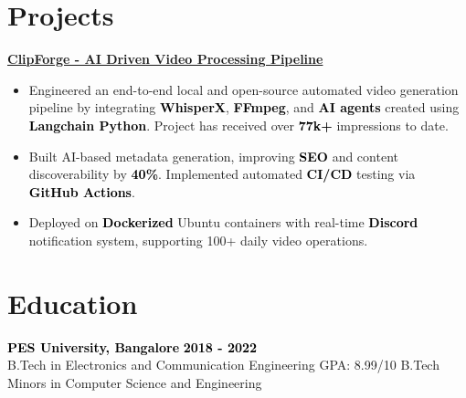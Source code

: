 \documentclass[a4paper,10pt]{article}
\newcommand{\bb}[1]{\textcolor{black}{\textbf{#1}}}
\begin{document}
\section{Projects}
\bb{\href{https://github.com/rajathjn/shorts_maker}{ClipForge - AI Driven Video Processing Pipeline}}
\smallskip
\begin{itemize}[nosep, leftmargin=2em, itemsep=3pt]
    \item Engineered an end-to-end local and open-source automated video generation pipeline by integrating \bb{WhisperX}, \bb{FFmpeg}, and \bb{AI agents} created using \bb{Langchain Python}. Project has received over \bb{77k+} impressions to date.
    \item Built AI-based metadata generation, improving \bb{SEO} and content discoverability by \bb{40\%}. Implemented automated \bb{CI/CD} testing via \bb{GitHub Actions}.
    \item Deployed on \bb{Dockerized} Ubuntu containers with real-time \bb{Discord} notification system, supporting 100+ daily video operations.
\end{itemize}
\vspace{-1em}
%
%
\section{Education}
\bb{PES University, Bangalore} \hfill \bb{2018 - 2022} \\
B.Tech in Electronics and Communication Engineering \hfill GPA: 8.99/10
\newline
B.Tech Minors in Computer Science and Engineering
%
%
\end{document}
